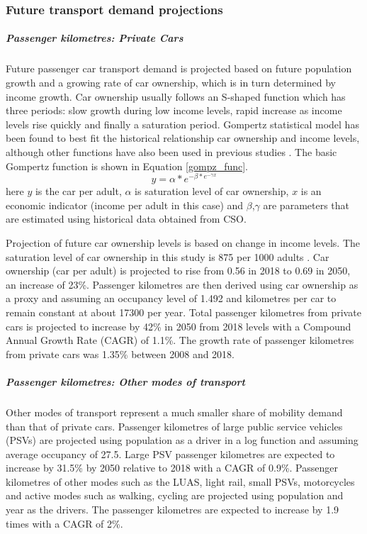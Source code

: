 \documentclass[journal abbreviation, manuscript]{copernicus}
\begin{document}
\subsubsection{Future transport demand projections}
\subparagraph{Passenger kilometres: Private Cars}
Future passenger car transport demand is projected based on future population growth and a growing rate of car ownership, which is in turn determined by income growth. Car ownership usually follows an S-shaped function which has three periods: slow growth during low income levels, rapid increase as income levels rise quickly and finally a saturation period. Gompertz statistical model has been found to best fit the historical relationship car ownership and income levels, although other functions have also been used in previous studies \cite{Lian2018}. The basic Gompertz function is shown in Equation \ref{gompz_func}.
\begin{equation}
\label{gompz_func}
 y=\alpha*e^{-\beta*e^{-\gamma x}}
\end{equation}
here $y$ is the car per adult, $\alpha$ is saturation level of car ownership, $x$ is an economic indicator (income per adult in this case) and $\beta$,$\gamma$ are parameters that are estimated using historical data obtained from CSO. 

Projection of future car ownership levels is based on change in income levels. The saturation level of car ownership in this study is 875 per 1000 adults \cite{AECOMIrelandLimited2019}. Car ownership (car per adult) is projected to rise from 0.56 in 2018 to 0.69 in 2050, an increase of 23\%. Passenger kilometres are then derived using car ownership as a proxy and assuming an occupancy level of 1.492 and kilometres per car to remain constant at about 17300 per year. Total passenger kilometres from private cars is projected to increase by 42\% in 2050 from 2018 levels with a Compound Annual Growth Rate (CAGR) of 1.1\%. The growth rate of passenger kilometres from private cars was 1.35\% between 2008 and 2018. 

\subparagraph{Passenger kilometres: Other modes of transport}
Other modes of transport represent a much smaller share of mobility demand than that of private cars. Passenger kilometres of large public service vehicles (PSVs) are projected using population as a driver in a log function and assuming average occupancy of 27.5. Large PSV passenger kilometres are expected to increase by 31.5\% by 2050 relative to 2018 with a CAGR of 0.9\%. Passenger kilometres of other modes such as the LUAS, light rail, small PSVs, motorcycles and active modes such as walking, cycling are projected using population and year as the drivers. The passenger kilometres are expected to increase by 1.9 times with a CAGR of 2\%. 
\end{document}
